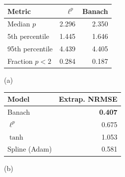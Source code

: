 \begin{minipage}[t]{.56\linewidth}\vspace{0pt}\centering
\begin{tabular}{lrr}
\toprule
Metric & $\ell^p$ & Banach \\
\midrule
Median $p$ & 2.296 & 2.350 \\
5th percentile & 1.445 & 1.646 \\
95th percentile & 4.439 & 4.405 \\
Fraction $p<2$ & 0.284 & 0.187 \\
\bottomrule\end{tabular}\par\smallskip (a)\end{minipage}\hfill
\begin{minipage}[t]{.38\linewidth}\vspace{0pt}\centering
\begin{tabular}{lr}
\toprule
Model & Extrap. NRMSE \\
\midrule
Banach & \textbf{0.407} \\
$\ell^p$ & 0.675 \\
$\tanh$ & 1.053 \\
Spline (Adam) & 0.581 \\
\bottomrule\end{tabular}\par\smallskip (b)\end{minipage}
